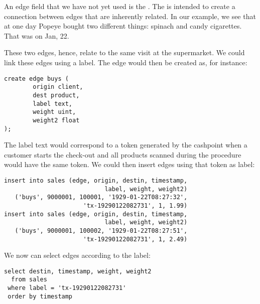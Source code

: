 
An edge field that we have not yet used is the .
The  is intended to create a connection
between edges that are inherently related. In our example, we see
that at one day Popeye bought two different things:
spinach and candy cigarettes.
That was on Jan, 22.

\begin{minipage}{\textwidth}
These two edges, hence, relate to the same visit at the supermarket.
We could link these edges using a label. The edge would then be created
as, for instance:
\begin{sqlcode}
\begin{lstlisting}
create edge buys (
        origin client,
        dest product,
        label text,
        weight uint,
        weight2 float
);
\end{lstlisting}
\end{sqlcode}
\end{minipage}

The label text would correspond to a token generated by
the cashpoint when a customer starts the check-out
and all products scanned during the procedure
would have the same token.
We could then insert edges using that token as label:

\begin{sqlcode}
\begin{lstlisting}
insert into sales (edge, origin, destin, timestamp,
                            label, weight, weight2)
   ('buys', 9000001, 100001, '1929-01-22T08:27:32',
                      'tx-19290122082731', 1, 1.99)
insert into sales (edge, origin, destin, timestamp,
                            label, weight, weight2)
   ('buys', 9000001, 100002, '1929-01-22T08:27:51', 
                      'tx-19290122082731', 1, 2.49)
\end{lstlisting}
\end{sqlcode}

\begin{minipage}{\textwidth}
We now can select edges according to the label:

\begin{sqlcode}
\begin{lstlisting}
select destin, timestamp, weight, weight2
  from sales 
 where label = 'tx-19290122082731'
 order by timestamp
\end{lstlisting}
\end{sqlcode}
\end{minipage}

